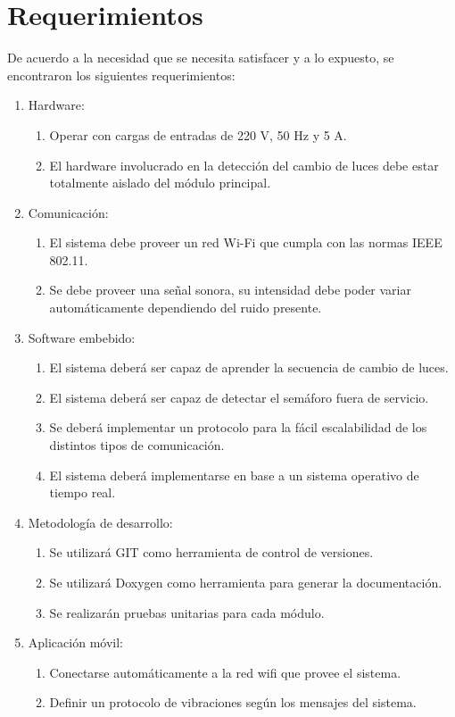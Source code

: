 \section{Requerimientos}

De acuerdo a la necesidad que se necesita satisfacer y a lo expuesto, se encontraron los siguientes requerimientos:

\begin{enumerate}[{R}1.]
\item Hardware:
	\begin{enumerate}[{R1.}1.]
		\item Operar con cargas de entradas de 220 V, 50 Hz y 5 A.
		\item El hardware involucrado en la detección del cambio de luces debe estar totalmente aislado del módulo principal.
	\end{enumerate}
\item Comunicación:
	\begin{enumerate}[{R2.}1.]
		\item El sistema debe proveer un red Wi-Fi que cumpla con las normas IEEE 802.11.
		\item Se debe proveer una señal sonora, su intensidad debe poder variar automáticamente dependiendo del ruido presente.
	\end{enumerate}
\item Software embebido:
	\begin{enumerate}[{R3.}1.]
		\item El sistema deberá ser capaz de aprender la secuencia de cambio de luces.
		\item El sistema deberá ser capaz de detectar el semáforo fuera de servicio.
		\item Se deberá implementar un protocolo para la fácil escalabilidad de los distintos tipos de comunicación.
		\item El sistema deberá implementarse en base a un sistema operativo de tiempo real. 
	\end{enumerate}
\item Metodología de desarrollo:
	\begin{enumerate}[{R4.}1.]
		\item Se utilizará GIT como herramienta de control de versiones.
		\item Se utilizará Doxygen como herramienta para generar la documentación.
		\item Se realizarán pruebas unitarias para cada módulo.
	\end{enumerate}
\item Aplicación móvil:
	\begin{enumerate}[{R5.}1.]
		\item Conectarse automáticamente a la red wifi que provee el sistema.
		\item Definir un protocolo de vibraciones según los mensajes del sistema.
	\end{enumerate}
\end{enumerate}

